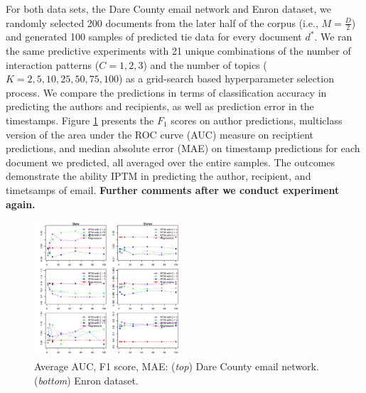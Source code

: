 \documentclass{article}
\begin{document}
For both data sets, the Dare County email network and Enron dataset, we randomly selected 200 documents from the later half of the corpus (i.e., $M = \frac{D}{2}$) and generated 100 samples of predicted tie data for every document $d^*$. We ran the same predictive experiments with 21 unique combinations of the number of interaction patterns ($C = 1, 2, 3$) and the number of topics ($K = 2, 5, 10, 25, 50, 75, 100$) as a grid-search based hyperparameter selection process. We compare the predictions in terms of classification accuracy in predicting the authors and recipients, as well as prediction error in the timestamps. Figure \ref{fig:PPE} presents the $F_1$ scores on author predictions, multiclass version of the area under the ROC curve (AUC) measure \cite{hand2001simple} on reciptient predictions, and median absolute error (MAE) on timestamp predictions for each document we predicted, all averaged over the entire samples. The outcomes demonstrate the ability IPTM in predicting the author, recipient, and timetsamps of email. \textbf{Further comments after we conduct experiment again.}
\begin{figure}[h]
	\centering
	\includegraphics[width=0.49\textwidth, trim= 0.7cm 0cm 0cm 0cm, clip=true]{plots/PPE-1.png}  
	\caption{Average AUC, F1 score, MAE: (\textit{top}) Dare County email network. (\textit{bottom}) Enron dataset.}
	\label{fig:PPE}	
\end{figure}
\end{document}
